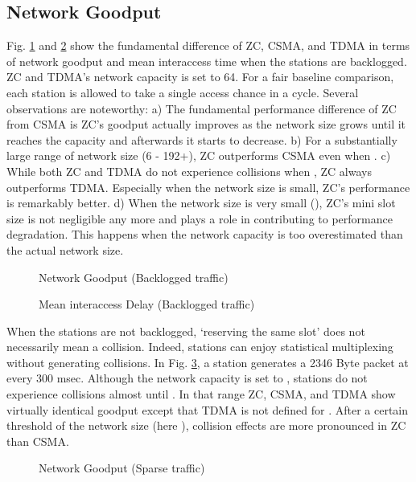 \documentclass{acm_proc_article-sp}
\begin{document}
\subsection{Network Goodput}
Fig. \ref{fig.backloggedgoodput} and \ref{fig.backloggeddelay} show the fundamental difference of ZC, CSMA, and TDMA in terms of network goodput and mean interaccess time when the stations are backlogged. ZC and TDMA's network capacity is set to 64. For a fair baseline comparison, each station is allowed to take a single access chance in a cycle. Several observations are noteworthy: a) The fundamental performance difference of ZC from CSMA is ZC's goodput actually improves as the network size grows until it reaches the capacity and afterwards it starts to decrease. b) For a substantially large range of network size (6 - 192+), ZC outperforms CSMA even when . c) While both ZC and TDMA do not experience collisions when , ZC always outperforms TDMA. Especially when the network size is small, ZC's performance is remarkably better. d) When the network size is very small (), ZC's mini slot size is not negligible any more and plays a role in contributing to performance degradation. This happens when the network capacity is too overestimated than the actual network size.
\begin{figure}[ht]
    \begin{center}
    \caption{Network Goodput (Backlogged traffic)} \label{fig.backloggedgoodput}
    \end{center}
\end{figure}
\begin{figure}[ht]
    \begin{center}
    \caption{Mean interaccess Delay (Backlogged traffic)} \label{fig.backloggeddelay}
    \end{center}
\end{figure}
When the stations are not backlogged, `reserving the same slot' does not necessarily mean a collision. Indeed, stations can enjoy statistical multiplexing without generating collisions. In Fig. \ref{fig.sparsegoodput}, a station generates a 2346 Byte packet at every 300 msec. Although the network capacity is set to , stations do not experience collisions almost until . In that range ZC, CSMA, and TDMA show virtually identical goodput except that TDMA is not defined for . After a certain threshold of the network size (here ), collision effects are more pronounced in ZC than CSMA.
\begin{figure}[ht]
    \begin{center}
    \caption{Network Goodput (Sparse traffic)} \label{fig.sparsegoodput}
    \end{center}
\vspace{-0.2in}
\end{figure}
\end{document}
